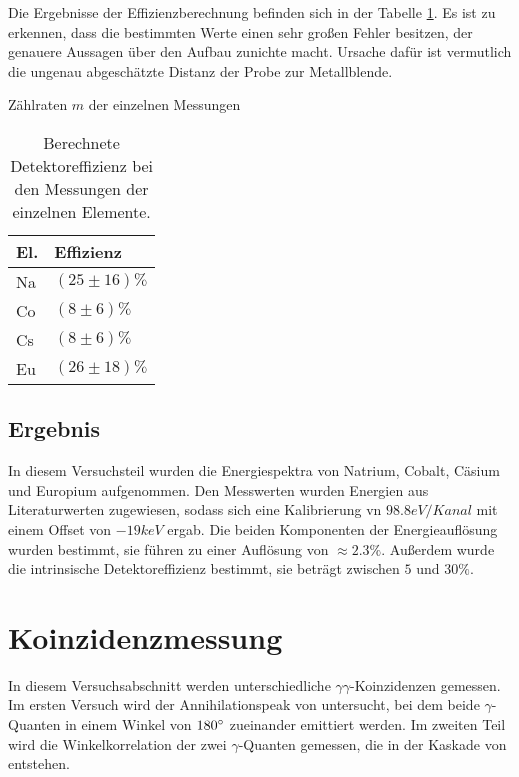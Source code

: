 \documentclass{../Misc/MontavonLaTeX/Montavon}
\begin{document}
Die Ergebnisse der Effizienzberechnung befinden sich in der Tabelle \ref{tbl:Effizienzen}. Es ist zu erkennen, dass die bestimmten Werte einen sehr großen Fehler besitzen, der genauere Aussagen über den Aufbau zunichte macht. Ursache dafür ist vermutlich die ungenau abgeschätzte Distanz der Probe zur Metallblende.

\begin{table}[htbp]
\centering

\caption{Zählraten $m$ der einzelnen Messungen}
\label{tbl:Zaehlraten}
\end{table}

\begin{table}[htbp]
\centering
\begin{tabular}{|l|l|}
\hline
El. & Effizienz  \\
\hline\hline
Na & $(25 \pm 16) \unit{\%}$ \\
Co & $(8 \pm 6) \unit{\%}$ \\
Cs & $(8 \pm 6) \unit{\%}$ \\
Eu & $(26 \pm 18) \unit{\%}$ \\
\hline
\end{tabular}
\caption{Berechnete Detektoreffizienz bei den Messungen der einzelnen Elemente.}
\label{tbl:Effizienzen}
\end{table}

\subsection{Ergebnis}
In diesem Versuchsteil wurden die Energiespektra von Natrium, Cobalt, Cäsium und Europium aufgenommen. Den Messwerten wurden Energien aus Literaturwerten zugewiesen, sodass sich eine Kalibrierung vn $98.8 \unit{eV/Kanal}$ mit einem Offset von $-19 \unit{keV}$ ergab.
Die beiden Komponenten der Energieauflösung wurden bestimmt, sie führen zu einer Auflösung von $\approx 2.3 \unit{\%}$. 
Außerdem wurde die intrinsische Detektoreffizienz bestimmt, sie beträgt zwischen $5$ und $30 \unit{\%}$.


\section{Koinzidenzmessung}
In diesem Versuchsabschnitt werden unterschiedliche $\gamma\gamma$-Koinzidenzen gemessen. Im ersten Versuch wird der Annihilationspeak von  untersucht, bei dem beide $\gamma$-Quanten in einem Winkel von $180 ^{\circ}$ zueinander emittiert werden. 
Im zweiten Teil wird die Winkelkorrelation der zwei $\gamma$-Quanten gemessen, die in der Kaskade von  entstehen. 
\end{document}

